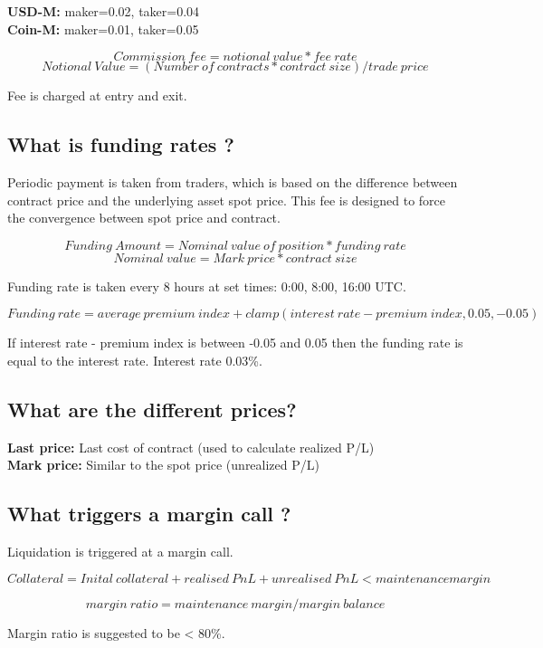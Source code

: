\documentclass[11pt]{scrartcl} %
\begin{document}
\textbf{USD-M:} maker=0.02, taker=0.04\\
\textbf{Coin-M:} maker=0.01, taker=0.05 

\[ Commission\:fee = notional\:value * fee\:rate \]
\[ Notional\:Value = (Number\:of\:contracts*contract\:size)/trade\:price \]

Fee is charged at entry and exit.

\subsection{What is funding rates ?}

Periodic payment is taken from traders, which is based on the difference between contract price and the
underlying asset spot price. This fee is designed to force the convergence between spot price and 
contract.

\[ Funding\:Amount = Nominal\:value\:of\:position * funding\:rate \]
\[ Nominal\:value = Mark\:price * contract\:size \]

Funding rate is taken every 8 hours at set times: 0:00, 8:00, 16:00 UTC.

\[ Funding\:rate = average\:premium\:index + clamp(interest\:rate - premium\:index, 0.05,-0.05) \] 

If interest rate - premium index is between -0.05 and 0.05 then the funding rate is equal to the
interest rate. Interest rate 0.03\%.

\subsection{What are the different prices?}

\textbf{Last price:} Last cost of contract (used to calculate realized P/L)\\
\textbf{Mark price:} Similar to the spot price (unrealized P/L)

\subsection{What triggers a margin call ?}

Liquidation is triggered at a margin call.

\[ Collateral = Inital\:collateral + realised\:PnL + unrealised\:PnL < maintenance margin \]

\[ margin\:ratio = maintenance\:margin/margin\:balance \]

Margin ratio is suggested to be < 80\%.
\end{document}
